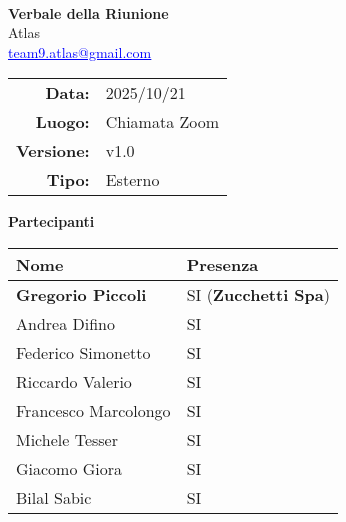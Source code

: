 \documentclass[a4paper,12pt]{article}
\makeatletter
\newcommand{\Gruppo}{Atlas}
\newcommand{\Email}{\href{mailto:team9.atlas@gmail.com}{\textcolor{blue}{\underline{team9.atlas@gmail.com}}}}
\newcommand{\TitoloVerbale}{Verbale della Riunione}
\newcommand{\DataVerbale}{2025/10/21}
\newcommand{\LuogoVerbale}{Chiamata Zoom}
\newcommand{\LogoGruppo}{img/AtlasLogo.png} %
\newcommand{\VersioneVerbale}{v1.0} %
\newcommand{\VerbaleEsterno}{Esterno}
\makeatother
\begin{document}
\begin{titlepage}
    \centering

    \vspace*{0cm}
    \\
    [.5cm]
    {\Huge \textbf{\TitoloVerbale}}\\[0.8cm]
    {\LARGE \Gruppo}\\[0.1cm]
    {\Email}\\[1.2cm]

    \begin{tabular}{rl}
        \textbf{Data:} & \DataVerbale \\
        \textbf{Luogo:} & \LuogoVerbale \\
        \textbf{Versione:} & \VersioneVerbale \\
        \textbf{Tipo:} & \VerbaleEsterno \\
    \end{tabular}

    \vspace{1.2cm}

    {\large \textbf{Partecipanti}}\\[0.5cm]
    \begin{tabular}{l|l}
        \textbf{Nome} & \textbf{Presenza} \\
        \hline
        \textbf{Gregorio Piccoli} & SI (\textbf{Zucchetti Spa})\\
        Andrea Difino & SI \\
        Federico Simonetto & SI \\
        Riccardo Valerio & SI \\
        Francesco Marcolongo & SI \\
        Michele Tesser & SI \\
        Giacomo Giora & SI \\
        Bilal Sabic & SI \\
    \end{tabular}

\end{titlepage}
\end{document}
